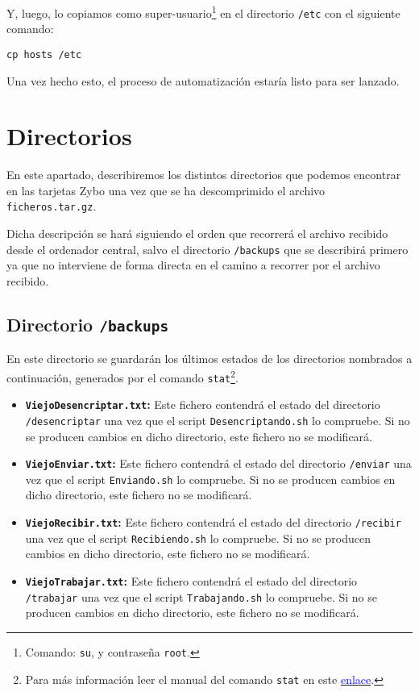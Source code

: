 \documentclass[12pt,letterpaper]{article}
\begin{document}
Y, luego, lo copiamos como super-usuario\footnote{Comando: \texttt{su}, y contraseña \texttt{root}.} en el directorio \texttt{/etc} con el siguiente comando:
\begin{center}
	\texttt{cp hosts /etc}
\end{center}

Una vez hecho esto, el proceso de automatización estaría listo para ser lanzado.

\section{Directorios}
En este apartado, describiremos los distintos directorios que podemos encontrar en las tarjetas Zybo una vez que se ha descomprimido el archivo \texttt{ficheros.tar.gz}.

Dicha descripción se hará siguiendo el orden que recorrerá el archivo recibido desde el ordenador central, salvo el directorio \texttt{/backups} que se describirá primero ya que no interviene de forma directa en el camino a recorrer por el archivo recibido.

\subsection{Directorio \texttt{/backups}}
En este directorio se guardarán los últimos estados de los directorios nombrados a continuación, generados por el comando \texttt{stat}\footnote{Para más información leer el manual del comando \texttt{stat} en este \href{https://linux.die.net/man/2/stat}{\textcolor{blue}{enlace}}.}.
\begin{itemize}
	\item \textbf{\texttt{ViejoDesencriptar.txt}:} Este fichero contendrá el estado del directorio \texttt{/desencriptar} una vez que el script \texttt{Desencriptando.sh} lo compruebe. Si no se producen cambios en dicho directorio, este fichero no se modificará.
	\item \textbf{\texttt{ViejoEnviar.txt}:} Este fichero contendrá el estado del directorio \texttt{/enviar} una vez que el script \texttt{Enviando.sh} lo compruebe. Si no se producen cambios en dicho directorio, este fichero no se modificará.
	\item \textbf{\texttt{ViejoRecibir.txt}:} Este fichero contendrá el estado del directorio \texttt{/recibir} una vez que el script \texttt{Recibiendo.sh} lo compruebe. Si no se producen cambios en dicho directorio, este fichero no se modificará.
	\item \textbf{\texttt{ViejoTrabajar.txt}:} Este fichero contendrá el estado del directorio \texttt{/trabajar} una vez que el script \texttt{Trabajando.sh} lo compruebe. Si no se producen cambios en dicho directorio, este fichero no se modificará.
\end{itemize}
\end{document}
